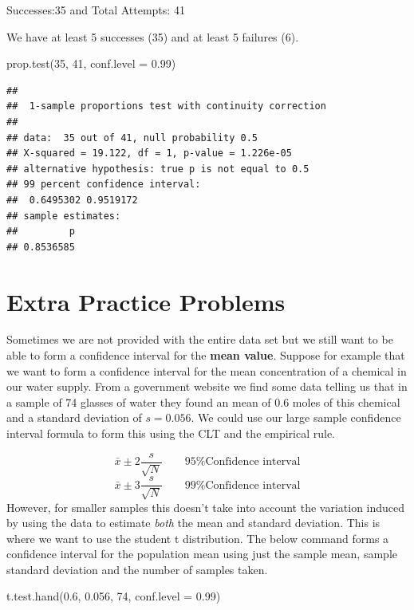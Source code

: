 \documentclass[
]{book}
\newenvironment{Shaded}{\begin{snugshade}}{\end{snugshade}}
\newcommand{\AttributeTok}[1]{\textcolor[rgb]{0.77,0.63,0.00}{#1}}
\newcommand{\DecValTok}[1]{\textcolor[rgb]{0.00,0.00,0.81}{#1}}
\newcommand{\FloatTok}[1]{\textcolor[rgb]{0.00,0.00,0.81}{#1}}
\newcommand{\FunctionTok}[1]{\textcolor[rgb]{0.00,0.00,0.00}{#1}}
\newcommand{\NormalTok}[1]{#1}
\theoremstyle{definition}
\theoremstyle{definition}
\theoremstyle{definition}
\theoremstyle{definition}
\theoremstyle{remark}
\begin{document}
Successes:35 and
Total Attempts: 41

We have at least 5 successes (35) and at least 5 failures (6).

\begin{Shaded}
\begin{Highlighting}[]
\FunctionTok{prop.test}\NormalTok{(}\DecValTok{35}\NormalTok{, }\DecValTok{41}\NormalTok{, }\AttributeTok{conf.level =} \FloatTok{0.99}\NormalTok{)}
\end{Highlighting}
\end{Shaded}

\begin{verbatim}
## 
##  1-sample proportions test with continuity correction
## 
## data:  35 out of 41, null probability 0.5
## X-squared = 19.122, df = 1, p-value = 1.226e-05
## alternative hypothesis: true p is not equal to 0.5
## 99 percent confidence interval:
##  0.6495302 0.9519172
## sample estimates:
##         p 
## 0.8536585
\end{verbatim}

\hypertarget{extra-practice-problems}{%
\section{Extra Practice Problems}\label{extra-practice-problems}}

Sometimes we are not provided with the entire data set but we still want to be able to form a confidence interval for the \textbf{mean value}. Suppose for example that we want to form a confidence interval for the mean concentration of a chemical in our water supply. From a government website we find some data telling us that in a sample of 74 glasses of water they found an mean of 0.6 moles of this chemical and a standard deviation of \(s=0.056\). We could use our large sample confidence interval formula to form this using the CLT and the empirical rule.

\[\bar{x} \pm 2\frac{s}{\sqrt{N}} \qquad \text{95\% Confidence interval}\]
\[\bar{x} \pm 3\frac{s}{\sqrt{N}} \qquad \text{99\% Confidence interval}\]
However, for smaller samples this doesn't take into account the variation induced by using the data to estimate \emph{both} the mean and standard deviation. This is where we want to use the student t distribution. The below command forms a confidence interval for the population mean using just the sample mean, sample standard deviation and the number of samples taken.

\begin{Shaded}
\begin{Highlighting}[]
\FunctionTok{t.test.hand}\NormalTok{(}\FloatTok{0.6}\NormalTok{, }\FloatTok{0.056}\NormalTok{, }\DecValTok{74}\NormalTok{, }\AttributeTok{conf.level =} \FloatTok{0.99}\NormalTok{)}
\end{Highlighting}
\end{Shaded}
\end{document}
